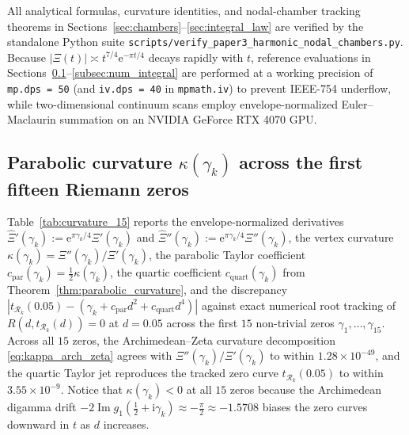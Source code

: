 \documentclass[11pt,a4paper,reqno]{amsart}
\theoremstyle{definition}
\theoremstyle{remark}
\numberwithin{equation}{section}
\newcommand{\ii}{\mathrm{i}}
\newcommand{\ee}{\mathrm{e}}
\newcommand{\Ima}{\operatorname{Im}}
\begin{document}
All analytical formulas, curvature identities, and nodal-chamber tracking theorems in Sections~\ref{sec:chambers}--\ref{sec:integral_law} are verified by the standalone Python suite \nolinkurl{scripts/verify_paper3_harmonic_nodal_chambers.py}. Because $|\Xi(t)| \asymp t^{7/4}\ee^{-\pi t/4}$ decays rapidly with $t$, reference evaluations in Sections~\ref{subsec:num_curvature}--\ref{subsec:num_integral} are performed at a working precision of \texttt{mp.dps = 50} (and \texttt{iv.dps = 40} in \texttt{mpmath.iv}) to prevent IEEE-754 underflow, while two-dimensional continuum scans employ envelope-normalized Euler--Maclaurin summation on an NVIDIA GeForce RTX 4070 GPU.

\subsection{Parabolic curvature \texorpdfstring{$\kappa(\gamma_k)$}{kappa(gamma\_k)} across the first fifteen Riemann zeros}\label{subsec:num_curvature}

Table~\ref{tab:curvature_15} reports the envelope-normalized derivatives $\widehat{\Xi}'(\gamma_k) := \ee^{\pi\gamma_k/4}\Xi'(\gamma_k)$ and $\widehat{\Xi}''(\gamma_k) := \ee^{\pi\gamma_k/4}\Xi''(\gamma_k)$, the vertex curvature $\kappa(\gamma_k) = \Xi''(\gamma_k)/\Xi'(\gamma_k)$, the parabolic Taylor coefficient $c_{\mathrm{par}}(\gamma_k) = \frac{1}{2}\kappa(\gamma_k)$, the quartic coefficient $c_{\mathrm{quart}}(\gamma_k)$ from Theorem~\ref{thm:parabolic_curvature}, and the discrepancy $|t_{\mathcal{R}_k}(0.05) - (\gamma_k + c_{\mathrm{par}}d^2 + c_{\mathrm{quart}}d^4)|$ against exact numerical root tracking of $R(d, t_{\mathcal{R}_k}(d)) = 0$ at $d = 0.05$ across the first $15$ non-trivial zeros $\gamma_1, \dots, \gamma_{15}$. Across all $15$ zeros, the Archimedean--Zeta curvature decomposition \eqref{eq:kappa_arch_zeta} agrees with $\Xi''(\gamma_k)/\Xi'(\gamma_k)$ to within $1.28 \times 10^{-49}$, and the quartic Taylor jet reproduces the tracked zero curve $t_{\mathcal{R}_k}(0.05)$ to within $3.55 \times 10^{-9}$. Notice that $\kappa(\gamma_k) < 0$ at all $15$ zeros because the Archimedean digamma drift $-2\Ima g_1(\frac{1}{2}+\ii\gamma_k) \approx -\frac{\pi}{2} \approx -1.5708$ biases the zero curves downward in $t$ as $d$ increases.
\end{document}
